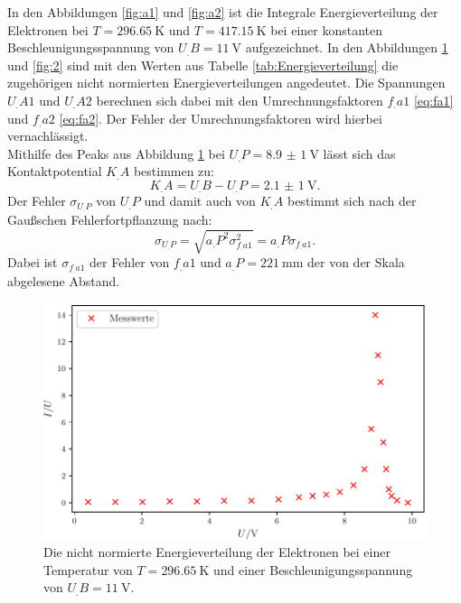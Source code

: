 In den Abbildungen \ref{fig:a1} und \ref{fig:a2} ist die Integrale Energieverteilung der Elektronen bei $T = \SI{296,65}{\kelvin}$ und $T = \SI{417,15}{\kelvin}$ bei einer konstanten Beschleunigungsspannung von $U_.B = \SI{11}{\volt}$ aufgezeichnet.
In den Abbildungen \ref{fig:1} und \ref{fig:2} sind mit den Werten aus Tabelle \ref{tab:Energieverteilung} die zugehörigen nicht normierten Energieverteilungen angedeutet. Die Spannungen $U_.{A1}$ und $U_.{A2}$ berechnen sich dabei mit den Umrechnungsfaktoren $f_.{a1}$ \eqref{eq:fa1} und $f_.{a2}$ \eqref{eq:fa2}. Der Fehler der Umrechnungsfaktoren wird hierbei vernachlässigt.\\  
Mithilfe des Peaks aus Abbildung \ref{fig:1} bei $U_.P = \SI{8,9(1)}{\volt}$ lässt sich das Kontaktpotential $K_.A$ bestimmen zu:
\[
K_.A = U_.B-U_.P = \SI{2,1(1)}{\volt}\text{.}
\]
Der Fehler $\sigma_{U_.P}$ von $U_.P$ und damit auch von $K_.A$ bestimmt sich nach der Gaußschen Fehlerfortpflanzung nach:
\[
\sigma_{U_.P} = \sqrt{a_.P^2\sigma_{f_.{a1}}^2} = a_.P\sigma_{f_.{a1}}\text{.}
\]
Dabei ist $\sigma_{f_.{a1}}$ der Fehler von $f_.{a1}$ und $a_.P = \SI{221}{\milli\metre}$ der von der Skala abgelesene Abstand.        

\begin{figure}
\centering
\includegraphics[width=\linewidth-70pt,height=\textheight-70pt,keepaspectratio]{content/images/fig1.pdf}
\caption{Die nicht normierte Energieverteilung der Elektronen bei einer Temperatur von $T=\SI{296,65}{\kelvin}$ und einer Beschleunigungsspannung von $U_.B=\SI{11}{\volt}$.}
\label{fig:1}
\end{figure}

